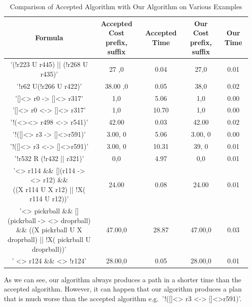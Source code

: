\begin{landscape}
\begin{table}[]
\centering
\small
\begin{tabular}{|c|c|c|c|c|}
\hline
Formula & \makecell{Accepted Cost \\ prefix, suffix} & Accepted Time & \makecell{Our Cost \\ prefix, suffix} & Our Time \\ \hline
     '(!r223 U r445) || (!r268 U r435)'  &         27 ,0     &      0.04         &      27,0   &     0.01     \\ \hline
      '!r62 U(!r266 U r422)'  &         38.00 ,0     &       0.05        &     38,0     &     0.02     \\ \hline
       '[]<> r0 -> []<> r317' &         1,0      &       5.06        &    1,0      &    0.00     \\ \hline
       '[]<> r0 <-> []<> r317'  & 1,0		&		10.70		& 1,0 	&  0.00 \\ \hline 
      '!(<><> r498 <-> r541)' &	42.00	&	0.03	&	42.00	&	0.02	\\		\hline
      '!([]<> r3 -> []<>r591)' &	 3.00, 0	&	5.06 	&	3.00, 0 	&	0.00	\\		\hline
      '!([]<> r3 <-> []<>r591)' &	 3.00, 0	&	10.31	&	39, 0	&	0.01	\\		\hline
      '!r532 R (!r432 || r321)' &	 0,0	&	4.97 	&	0,0	&	0.01 	\\		\hline
     \makecell{ '<> r114 \&\& [](r114 -> <> r12) \&\& \\((X r114 U X r12) || !X( r114 U r12))' }&	24.00	&	0.08 	&	24.00	&	0.01	\\		\hline
   \makecell{ '<> pickrball \&\& [](pickrball -> <> droprball) \\ \&\& ((X pickrball U X droprball) || !X( pickrball U droprball))' } &	47.00,0	&	28.87	&	47.00,0	&	0.03	\\		\hline
      ' <> r124 \&\& <> !r124' &	28.00,0	&	0.05 	&	28.00,0	&	0.01	\\		\hline
\end{tabular}
\caption{Comparison of Accepted Algorithm with Our Algorithm on Various Examples}
\label{table}
\end{table}
\end{landscape}

As we can see, our algorithm always produces a path in a shorter time than the accepted algorithm. However, it can happen that our algorithm produces a plan that is much worse than the accepted algorithm e.g.\ '!([]<> r3 <-> []<>r591)'. 

